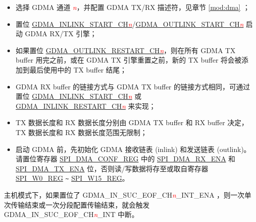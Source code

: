 \documentclass[main\_\_CN.tex]{subfiles}
\begin{document}
\begin{itemize}
    \item 选择 GDMA 通道 \textcolor{red}{\it{n}}，并配置 GDMA TX/RX 描述符，见章节  \ref{mod:dma} \textit{}；

    \item 置位  \hyperref[fielddesc:DMAINLINKSTARTCHN]{GDMA\_INLINK\_START\_CH\textcolor{red}{\it{n}}}/\hyperref[fielddesc:DMAOUTLINKSTARTCHN]{GDMA\_OUTLINK\_START\_CH\textcolor{red}{\it{n}}}  启动 GDMA RX/TX 引擎；

    \item 如果置位  \hyperref[fielddesc:DMAOUTLINKRESTARTCHN]{GDMA\_OUTLINK\_RESTART\_CH\textcolor{red}{\it{n}}}，则在所有 GDMA TX buffer 用完之前，或在 GDMA TX 引擎重置之前，新的 TX buffer 将会被添加到最后使用中的 TX buffer 结尾；

    \item GDMA RX buffer 的链接方式与 GDMA TX buffer 的链接方式相同，可通过置位  \hyperref[fielddesc:DMAINLINKSTARTCHN]{GDMA\_INLINK\_START\_CH\textcolor{red}{\it{n}}}  或 \hyperref[fielddesc:DMAINLINKRESTARTCHN]{GDMA\_INLINK\_RESTART\_CH\textcolor{red}{\it{n}}} 来实现；

    \item TX 数据长度和 RX 数据长度分别由 GDMA TX buffer 和 RX buffer 决定，TX 数据长度和 RX 数据长度范围无限制；

    \item 启动 GDMA 前，先初始化 GDMA 接收链表 (inlink) 和发送链表 (outlink)。请置位寄存器  \hyperref[regdesc:SPIDMACONFREG]{SPI\_DMA\_CONF\_REG} 中的  \hyperref[fielddesc:SPIDMARXENA]{SPI\_DMA\_RX\_ENA} 和 \hyperref[fielddesc:SPIDMATXENA]{SPI\_DMA\_TX\_ENA} 位，否则读/写数据将存至或取自寄存器  \hyperref[regdesc:SPIW0REG]{SPI\_W0\_REG} \verb+~+ \hyperref[regdesc:SPIW15REG]{SPI\_W15\_REG}。

\end{itemize}

主机模式下，如果置位了 GDMA\_IN\_SUC\_EOF\_CH\textcolor{red}{\it{n}}\_INT\_ENA ，则一次单次传输结束或一次分段配置传输结束，就会触发 GDMA\_IN\_SUC\_EOF\_CH\textcolor{red}{\it{n}}\_INT  中断。
\end{document}
